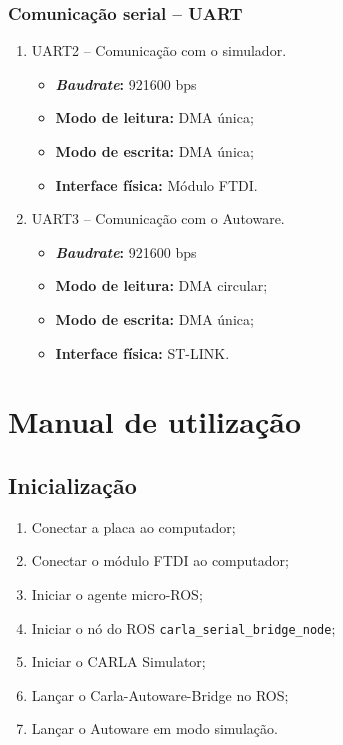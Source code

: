 \subsubsection*{Comunicação serial -- UART}

	\begin{enumerate}
		\item UART2 -- Comunicação com o simulador.
		\begin{itemize}
			\item \textbf{\textit{Baudrate}:} 921600 bps
			\item \textbf{Modo de leitura:} DMA única;
			\item \textbf{Modo de escrita:} DMA única;
			\item \textbf{Interface física:} Módulo FTDI.	
		\end{itemize}
	
		\item UART3 -- Comunicação com o Autoware.
		\begin{itemize}
			\item \textbf{\textit{Baudrate}:} 921600 bps
			\item \textbf{Modo de leitura:} DMA circular;
			\item \textbf{Modo de escrita:} DMA única;
			\item \textbf{Interface física:} ST-LINK.		
		\end{itemize}	
	
	\end{enumerate}

\clearpage

\section{Manual de utilização}

\subsection{Inicialização}

\begin{enumerate}
	\item Conectar a placa ao computador;
	\item Conectar o módulo FTDI ao computador;
	\item Iniciar o agente micro-ROS;
	\item Iniciar o nó do ROS \texttt{carla\_serial\_bridge\_node};
	\item Iniciar o CARLA Simulator;
	\item Lançar o Carla-Autoware-Bridge no ROS;
	\item Lançar o Autoware em modo simulação.
\end{enumerate}

